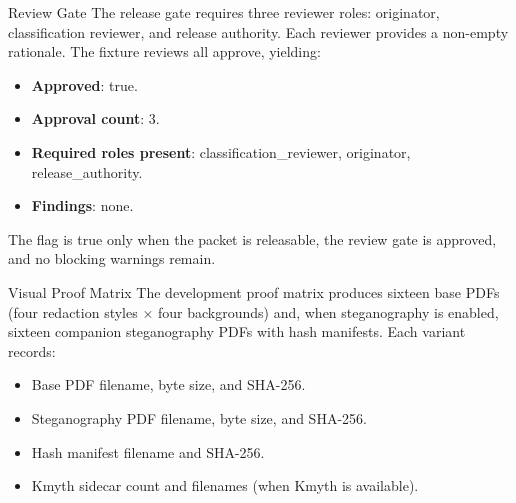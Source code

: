 \documentclass[
  ignorenonframetext,
]{beamer}
\newcounter{none} %
\providecommand{\tightlist}{%
  \setlength{\itemsep}{0pt}\setlength{\parskip}{0pt}}
\begin{document}
\begin{frame}{Review Gate}
\protect{}\label{review-gate}
The release gate requires three reviewer roles: originator,
classification reviewer, and release authority. Each reviewer provides a
non-empty rationale. The fixture reviews all approve, yielding:

\begin{itemize}
\tightlist
\item
  \textbf{Approved}: true.
\item
  \textbf{Approval count}: 3.
\item
  \textbf{Required roles present}: classification\_reviewer, originator,
  release\_authority.
\item
  \textbf{Findings}: none.
\end{itemize}

The  flag is true only when the
packet is releasable, the review gate is approved, and no blocking
warnings remain.
\end{frame}

\begin{frame}[allowframebreaks]{Visual Proof Matrix}
\protect{}\label{visual-proof-matrix}
The development proof matrix produces sixteen base PDFs (four redaction
styles × four backgrounds) and, when steganography is enabled, sixteen
companion steganography PDFs with hash manifests. Each variant records:

\begin{itemize}
\tightlist
\item
  Base PDF filename, byte size, and SHA-256.
\item
  Steganography PDF filename, byte size, and SHA-256.
\item
  Hash manifest filename and SHA-256.
\item
  Kmyth sidecar count and filenames (when Kmyth is available).
\end{itemize}
\end{frame}
\end{document}

